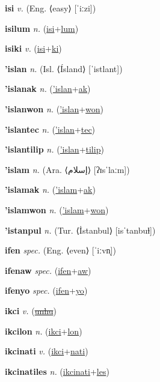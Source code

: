\textbf{\hypertarget{isi}{isi}} \textit{v.} (Eng. ⟨easy⟩ [ˈiːzi])


\textbf{\hypertarget{isilum}{isilum}} \textit{n.} (\hyperlink{isi}{isi}+\allowbreak \hyperlink{lum}{lum})


\textbf{\hypertarget{isiki}{isiki}} \textit{v.} (\hyperlink{isi}{isi}+\allowbreak \hyperlink{ki}{ki})


\textbf{\hypertarget{'islan}{'islan}} \textit{n.} (Isl. ⟨Ísland⟩ [ˈistlant])


\textbf{\hypertarget{'islanak}{'islanak}} \textit{n.} (\hyperlink{'islan}{'islan}+\allowbreak \hyperlink{ak}{ak})


\textbf{\hypertarget{'islanwon}{'islanwon}} \textit{n.} (\hyperlink{'islan}{'islan}+\allowbreak \hyperlink{won}{won})


\textbf{\hypertarget{'islantec}{'islantec}} \textit{n.} (\hyperlink{'islan}{'islan}+\allowbreak \hyperlink{tec}{tec})


\textbf{\hypertarget{'islantilip}{'islantilip}} \textit{n.} (\hyperlink{'islan}{'islan}+\allowbreak \hyperlink{tilip}{tilip})


\textbf{\hypertarget{'islam}{'islam}} \textit{n.} (Ara. ⟨{\arabics{}إسلام}⟩ [ʔɪsˈlaːm])


\textbf{\hypertarget{'islamak}{'islamak}} \textit{n.} (\hyperlink{'islam}{'islam}+\allowbreak \hyperlink{ak}{ak})


\textbf{\hypertarget{'islamwon}{'islamwon}} \textit{n.} (\hyperlink{'islam}{'islam}+\allowbreak \hyperlink{won}{won})


\textbf{\hypertarget{'istanpul}{'istanpul}} \textit{n.} (Tur. ⟨İstanbul⟩ [isˈtanbuɫ])


\textbf{\hypertarget{ifen}{ifen}} \textit{spec.} (Eng. ⟨even⟩ [ˈiːvn̩])


\textbf{\hypertarget{ifenaw}{ifenaw}} \textit{spec.} (\hyperlink{ifen}{ifen}+\allowbreak \hyperlink{aw}{aw})


\textbf{\hypertarget{ifenyo}{ifenyo}} \textit{spec.} (\hyperlink{ifen}{ifen}+\allowbreak \hyperlink{yo}{yo})


\textbf{\hypertarget{ikci}{ikci}} \textit{v.} (\hyperlink{unhu}{\sout{unhu}})


\textbf{\hypertarget{ikcilon}{ikcilon}} \textit{n.} (\hyperlink{ikci}{ikci}+\allowbreak \hyperlink{lon}{lon})


\textbf{\hypertarget{ikcinati}{ikcinati}} \textit{v.} (\hyperlink{ikci}{ikci}+\allowbreak \hyperlink{nati}{nati})


\textbf{\hypertarget{ikcinatiles}{ikcinatiles}} \textit{n.} (\hyperlink{ikcinati}{ikcinati}+\allowbreak \hyperlink{les}{les})


